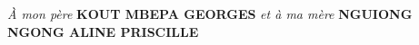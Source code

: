 
\thispagestyle{plain}

\vspace*{\fill}

\begin{center}
\begin{minipage}{0.80\textwidth}
\centering
\textit{À mon père} \textbf{KOUT MBEPA GEORGES} \textit{et à ma mère} \textbf{NGUIONG NGONG ALINE PRISCILLE}
\end{minipage}
\end{center}

\vspace*{\fill}

\myCleanStarChapterEnd

